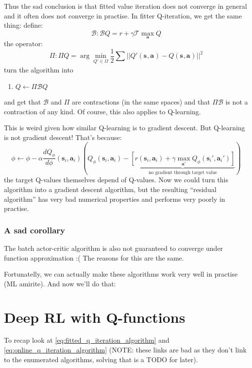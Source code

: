 \documentclass{report}
\newcommand{\argmin}{\arg\!\min}
\begin{document}
Thus the sad conclusion is that fitted value iteration does not converge in general
and it often does not converge in practise.
In fitter Q-iteration, we get the same thing:
define:
\begin{equation}
		\mathcal{B}: \mathcal{B} Q = r + \gamma \mathcal{T} \max_{\bm{a}} Q
\end{equation}
the operator:
\begin{equation}
		\Pi : \Pi Q = \argmin_{Q' \in \Omega} \frac{1}{2} \sum_{}^{} || Q'(\bm{s}_{}, \bm{a}_{}) - Q(\bm{s}_{}, \bm{a}_{})||^2
\end{equation}
turn the algorithm into
\begin{enumerate}
		\item $Q \leftarrow \Pi \mathcal{B} Q$
\end{enumerate}
and get that $\mathcal{B}$ and $\Pi$ are contractions (in the same spaces) and
that $\Pi\mathcal{B}$ is not a contraction of any kind.
Of course, this also applies to Q-learning.

This is weird given how similar Q-learning is to gradient descent.
But Q-learning is not gradient descent!
That's because:
\begin{equation}
	 \phi \leftarrow \phi - \alpha \frac{d Q_\phi}{d\phi} (\bm{s}_{i}, \bm{a}_{i}) \left( Q_\phi(\bm{s}_{i}, \bm{a}_{i}) - 
	 \underbrace{\left[ r(\bm{s}_{i}, \bm{a}_{i}) + \gamma \max_{\bm{a}'} Q_\phi (\bm{s}_{i}', \bm{a}_{i}') \right] }_{\text{no gradient through target value}}
\right)  	
\end{equation}
the target Q-values themselves depend of Q-values.
Now we could turn this algorithm into a gradient descent algorithm, but 
the resulting ``residual algorithm'' has very bad numerical properties and performs very poorly in practise.

\subsubsection{A sad corollary}
The batch actor-critic algorithm is also not guaranteed to converge under function approximation :(
\newline
The reasons for this are the same.

Fortunatelly, we can actually make these algorithms work very well in practise (ML amirite).
And now we'll do that:

\section{Deep RL with Q-functions}
To recap look at \ref{eq:fitted_q_iteration_algorithm} and \ref{eq:online_q_iteration_algorithm} (NOTE: these links are bad as they don't link to the 
enumerated algorithms, solving that is a TODO for later).
\end{document}
